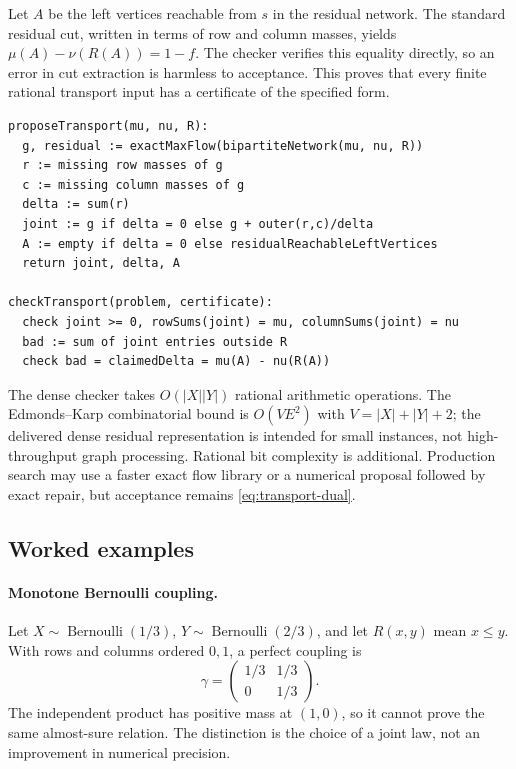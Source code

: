 Let $A$ be the left vertices reachable from $s$ in the residual network. The
standard residual cut, written in terms of row and column masses, yields
$\mu(A)-\nu(R(A))=1-f$. The checker verifies this equality directly, so an
error in cut extraction is harmless to acceptance. This proves that every
finite rational transport input has a certificate of the specified form.

\begin{lstlisting}
proposeTransport(mu, nu, R):
  g, residual := exactMaxFlow(bipartiteNetwork(mu, nu, R))
  r := missing row masses of g
  c := missing column masses of g
  delta := sum(r)
  joint := g if delta = 0 else g + outer(r,c)/delta
  A := empty if delta = 0 else residualReachableLeftVertices
  return joint, delta, A

checkTransport(problem, certificate):
  check joint >= 0, rowSums(joint) = mu, columnSums(joint) = nu
  bad := sum of joint entries outside R
  check bad = claimedDelta = mu(A) - nu(R(A))
\end{lstlisting}

The dense checker takes $O(|X||Y|)$ rational arithmetic operations. The
Edmonds--Karp combinatorial bound is $O(VE^2)$ with
$V=|X|+|Y|+2$; the delivered dense residual representation is intended for
small instances, not high-throughput graph processing. Rational bit complexity
is additional. Production search may use a faster exact flow library or a
numerical proposal followed by exact repair, but acceptance remains
\eqref{eq:transport-dual}.

\subsection{Worked examples}

\paragraph{Monotone Bernoulli coupling.}
Let $X\sim\operatorname{Bernoulli}(1/3)$,
$Y\sim\operatorname{Bernoulli}(2/3)$, and let $R(x,y)$ mean $x\le y$. With rows
and columns ordered $0,1$, a perfect coupling is
\[
 \gamma=\begin{pmatrix}1/3&1/3\\0&1/3\end{pmatrix}.
\]
The independent product has positive mass at $(1,0)$, so it cannot prove the
same almost-sure relation. The distinction is the choice of a joint law, not
an improvement in numerical precision.


